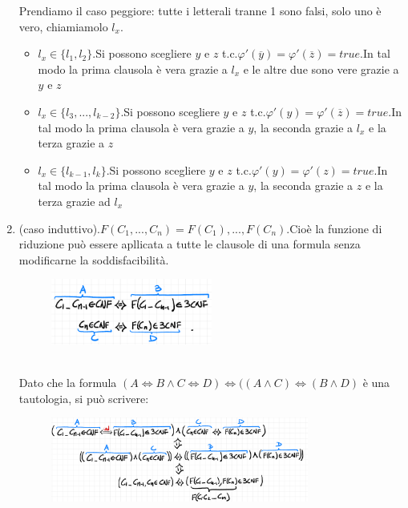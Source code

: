 \documentclass[a4paper]{article}
\begin{document}
\begin{enumerate}
		Prendiamo il caso peggiore: tutte i letterali tranne 1 sono falsi, solo uno è vero, chiamiamolo $l_x$.
		\begin{itemize}
			\item $l_x \in \{l_1,l_2\}$.Si possono scegliere $y$ e $z$ t.c.$ \varphi'(\overline y)=\varphi'(\overline z)=true$.In tal modo la prima clausola è vera grazie a $l_x$ e le altre due sono vere grazie a $y$ e $z$
			\item $l_x \in \{l_3, ... ,l_{k-2}\}$.Si possono scegliere $y$ e $z$ t.c.$ \varphi'(y)=\varphi'(\overline z)=true$.In tal modo la prima clausola è vera grazie a $y$, la seconda grazie a $l_x$ e la terza grazie a $z$
			\item $l_x \in \{l_{k-1},l_k\}$.Si possono scegliere $y$ e $z$ t.c.$ \varphi'(y)=\varphi'(z)=true$.In tal modo la prima clausola è vera grazie a $y$, la seconda grazie a $z$ e la terza grazie ad $l_x$
		\end{itemize}
	\item (caso induttivo).$F(C_1,  ... , C_n)= F(C_1), ... ,F(C_n)$.Cioè la funzione di riduzione può essere apllicata a tutte le clausole di una formula senza modificarne la soddisfacibilità.\\
		\begin{figure}[!ht]
                \centering
                \includegraphics[width = 0.5\textwidth]{./img/E9_induzione.png}
                \end{figure}\\
		Dato che la formula $(A \Leftrightarrow B \land C \Leftrightarrow D)\Leftrightarrow((A \land C)\Leftrightarrow (B \land D)$ è una tautologia, si può scrivere:\\
		\begin{figure}[!ht]
                \centering
                \includegraphics[width = 0.8\textwidth]{./img/E9_tautologia.png}
                \end{figure}\\


\end{enumerate}
\end{document}
